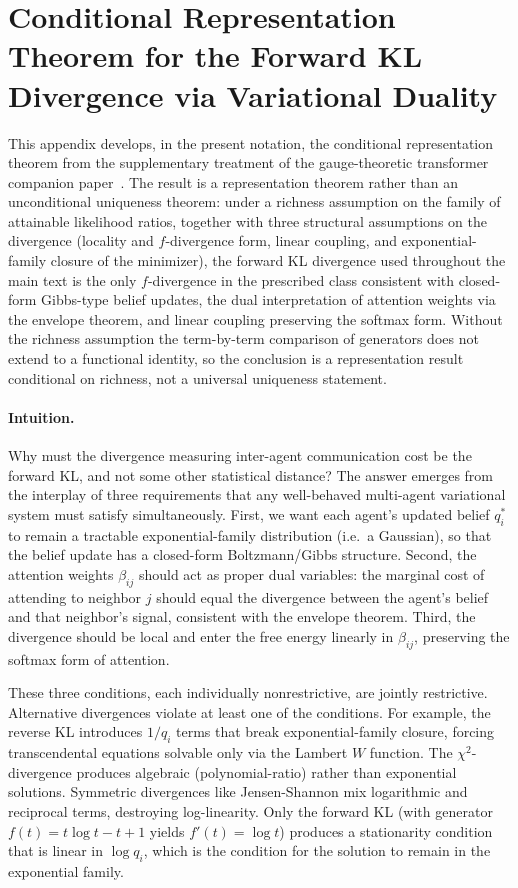 \documentclass[11pt]{article}
\begin{document}
\section*{Conditional Representation Theorem for the Forward KL Divergence via Variational Duality}
\label{app:conditional_representation}

This appendix develops, in the present notation, the conditional representation theorem from the supplementary treatment of the gauge-theoretic transformer companion paper~\cite{Dennis2025trans}. The result is a representation theorem rather than an unconditional uniqueness theorem: under a richness assumption on the family of attainable likelihood ratios, together with three structural assumptions on the divergence (locality and $f$-divergence form, linear coupling, and exponential-family closure of the minimizer), the forward KL divergence used throughout the main text is the only $f$-divergence in the prescribed class consistent with closed-form Gibbs-type belief updates, the dual interpretation of attention weights via the envelope theorem, and linear coupling preserving the softmax form. Without the richness assumption the term-by-term comparison of generators does not extend to a functional identity, so the conclusion is a representation result conditional on richness, not a universal uniqueness statement.

\paragraph{Intuition.}
Why must the divergence measuring inter-agent communication cost be the forward KL, and not some other statistical distance? The answer emerges from the interplay of three requirements that any well-behaved multi-agent variational system must satisfy simultaneously. First, we want each agent's updated belief $q_i^*$ to remain a tractable exponential-family distribution (i.e.\ a Gaussian), so that the belief update has a closed-form Boltzmann/Gibbs structure. Second, the attention weights $\beta_{ij}$ should act as proper dual variables: the marginal cost of attending to neighbor $j$ should equal the divergence between the agent's belief and that neighbor's signal, consistent with the envelope theorem. Third, the divergence should be local and enter the free energy linearly in $\beta_{ij}$, preserving the softmax form of attention.

These three conditions, each individually nonrestrictive, are jointly restrictive. Alternative divergences violate at least one of the conditions. For example, the reverse KL introduces $1/q_i$ terms that break exponential-family closure, forcing transcendental equations solvable only via the Lambert $W$ function. The $\chi^2$-divergence produces algebraic (polynomial-ratio) rather than exponential solutions. Symmetric divergences like Jensen-Shannon mix logarithmic and reciprocal terms, destroying log-linearity. Only the forward KL (with generator $f(t) = t\log t - t + 1$ yields $f'(t) = \log t$) produces a stationarity condition that is linear in $\log q_i$, which is the condition for the solution to remain in the exponential family.
\end{document}
